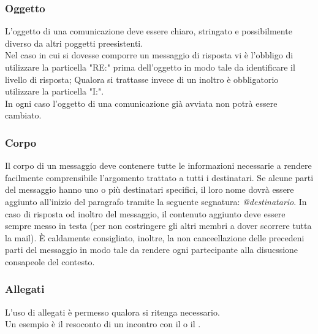     \subsubsection{Oggetto}
      L'oggetto di una comunicazione deve essere chiaro, stringato e possibilmente diverso da altri poggetti preesistenti.\\
      Nel caso in cui si dovesse comporre un messaggio di risposta vi è l'obbligo di utilizzare la particella "RE:" prima dell'oggetto in modo tale da identificare
      il livello di risposta; Qualora si trattasse invece di un inoltro è obbligatorio utilizzare la particella "I:".\\
      In ogni caso l'oggetto di una comunicazione già avviata non potrà essere cambiato.
    \subsubsection{Corpo}
      Il corpo di un messaggio deve contenere tutte le informazioni necessarie a rendere facilmente comprensibile l’argomento trattato a tutti i destinatari.
      Se alcune parti del messaggio hanno uno o più destinatari specifici, il loro nome dovrà essere aggiunto all’inizio del paragrafo tramite la seguente segnatura: \emph{@destinatario}.
      In caso di risposta od inoltro del messaggio, il contenuto aggiunto deve essere sempre messo in testa (per non costringere gli altri membri a dover scorrere tutta la mail).
      È caldamente consigliato, inoltre, la non canceellazione delle precedeni parti del messaggio in modo tale da rendere ogni partecipante alla disucssione consapeole del contesto.
    \subsubsection{Allegati}
      L'uso di allegati è permesso qualora si ritenga necessario.\\
      Un esempio è il resoconto di un incontro con il  o il .
